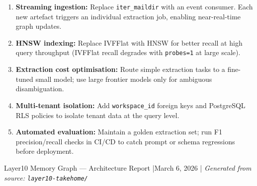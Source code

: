 \documentclass[11pt,a4paper]{article}
\newcommand{\code}[1]{\texttt{\small#1}}
\begin{document}
\begin{enumerate}[leftmargin=*, itemsep=4pt]
  \item \textbf{Streaming ingestion:} Replace \code{iter\_maildir} with an
    event consumer.  Each new artefact triggers an individual extraction job,
    enabling near-real-time graph updates.
  \item \textbf{HNSW indexing:} Replace IVFFlat with HNSW for better recall
    at high query throughput (IVFFlat recall degrades with \code{probes=1}
    at large scale).
  \item \textbf{Extraction cost optimisation:} Route simple extraction tasks to
    a fine-tuned small model; use large frontier models only for ambiguous
    disambiguation.
  \item \textbf{Multi-tenant isolation:} Add \code{workspace\_id} foreign keys
    and PostgreSQL RLS policies to isolate tenant data at the query level.
  \item \textbf{Automated evaluation:} Maintain a golden extraction set;
    run F1 precision/recall checks in CI/CD to catch prompt or schema
    regressions before deployment.
\end{enumerate}

\vfill
\begin{center}
\small\sffamily\color{medgray}
Layer10 Memory Graph — Architecture Report \quad|\quad March 6, 2026 \quad|\quad
\textit{Generated from source: \texttt{layer10-takehome/}}
\end{center}
\end{document}
